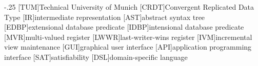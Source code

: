 \documentclass[headsepline,footsepline,footinclude=false,oneside,fontsize=11pt,paper=a4,listof=totoc,bibliography=totoc]{scrbook} %
\begin{document}


\frontmatter{}





\tableofcontents{}

\mainmatter{}







\appendix{}


\begin{acronym}
	\itemsep-.25\baselineskip
	[TUM]{Technical University of Munich}
	[CRDT]{Convergent Replicated Data Type}
	[IR]{intermediate representation}
	[AST]{abstract syntax tree}
	[EDBP]{extensional database predicate}
	[IDBP]{intensional database predicate}
	[MVR]{multi-valued register}
	[LWWR]{last-writer-wins register}
	[IVM]{incremental view maintenance}
	[GUI]{graphical user interface}
	[API]{application programming interface}
	[SAT]{satisfiability}
	[DSL]{domain-specific language}
\end{acronym}

\listoffigures{}
\printbibliography{}
\end{document}
